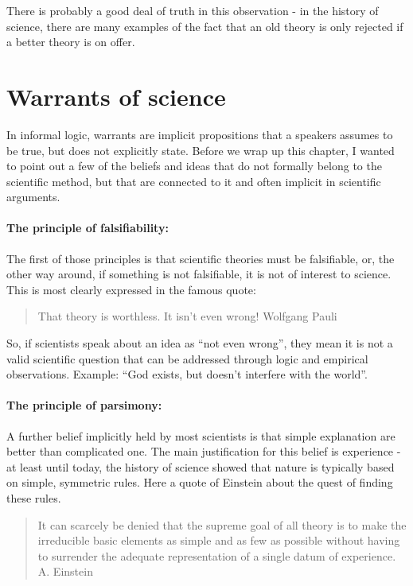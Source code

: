 \documentclass{tufte-book}
\begin{document}
There is probably a good deal of truth in this observation - in the history of science, there are many examples of the fact that an old theory is only rejected if a better theory is on offer. 


\section{Warrants of science}

In informal logic, warrants are implicit propositions that a speakers assumes to be true, but does not explicitly state. Before we wrap up this chapter, I wanted to point out a few of the beliefs and ideas that do not formally belong to the scientific method, but that are connected to it and often implicit in scientific arguments. 

\paragraph{The principle of falsifiability:} The first of those principles is that scientific theories must be falsifiable, or, the other way around, if something is not falsifiable, it is not of interest to science. This is most clearly expressed in the famous quote:
\begin{quote}
That theory is worthless. It isn't even wrong! Wolfgang Pauli
\end{quote}
So, if scientists speak about an idea as ``not even wrong'', they mean it is not a valid scientific question that can be addressed through logic and empirical observations. Example: ``God exists, but doesn’t interfere with the world''.
 
\paragraph{The principle of parsimony:} A further belief implicitly held by most scientists is that simple explanation are better than complicated one. The main justification for this belief is experience - at least until today, the history of science showed that nature is typically based on simple, symmetric rules. Here a quote of Einstein about the quest of finding these rules. 


\begin{quote}
It can scarcely be denied that the supreme goal of all theory is to make the irreducible basic elements as simple and as few as possible without having to surrender the adequate representation of a single datum of experience. A. Einstein
\end{quote}
\end{document}

